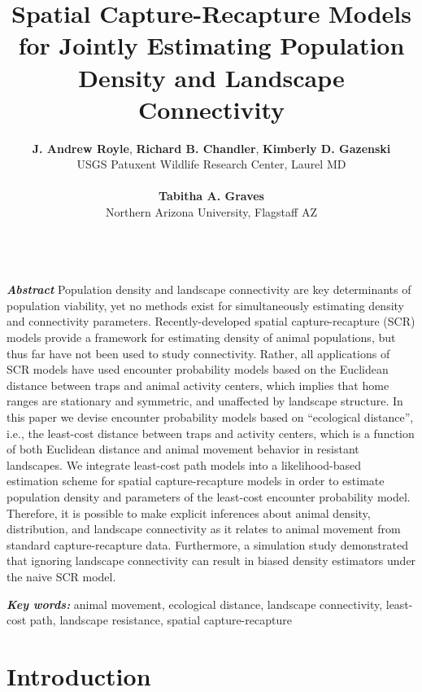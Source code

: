 \documentclass[12pt]{article}
\title{Spatial Capture-Recapture Models for
Jointly Estimating Population Density and
Landscape Connectivity}
\author{
{\bf J. Andrew Royle}, {\bf Richard B. Chandler},
{\bf Kimberly D. Gazenski} \\
USGS Patuxent Wildlife Research Center, Laurel MD \\ \\
{\bf Tabitha A. Graves} \\
Northern Arizona University, Flagstaff AZ \\ \\
}
\begin{document}
\maketitle

\date


\linenumbers


\begin{spacing}{1.8}

\begin{flushleft}
{\em \bf Abstract}
Population density and landscape connectivity are key determinants of
population viability, yet no methods exist for
simultaneously estimating density and connectivity parameters.
Recently-developed spatial capture-recapture (SCR) models
provide a framework for estimating density of animal populations,
but thus far have not been used to study connectivity.  Rather, all
applications of SCR models have used encounter probability models
based on the Euclidean distance between traps and animal activity
centers, which implies that home ranges are stationary and
symmetric, and unaffected by landscape %
structure. In this paper we devise encounter probability models based
on ``ecological distance'', i.e., the least-cost distance between
traps and activity centers, which is a function of both Euclidean
distance and animal movement behavior in %
resistant landscapes. We
integrate least-cost path models into a likelihood-based estimation
scheme for spatial capture-recapture models in order to estimate
population density and parameters of the least-cost encounter
probability model.  Therefore, it is possible to make explicit
inferences about animal density, distribution, and landscape
connectivity as it relates to animal movement from standard
capture-recapture data.  Furthermore, a simulation study demonstrated
that ignoring landscape connectivity can result in biased density
estimators under the naive SCR model. %

{\em \bf Key words:} animal movement, ecological distance, landscape connectivity,
least-cost path, landscape resistance, spatial capture-recapture

\end{flushleft}



\section{Introduction}


\end{spacing}
\end{document}
